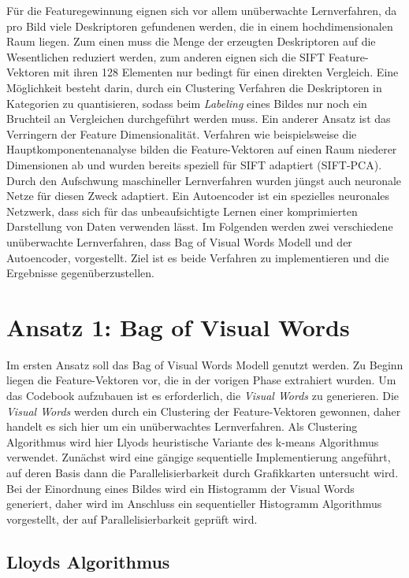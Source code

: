 Für die Featuregewinnung eignen sich vor allem unüberwachte Lernverfahren, da pro Bild viele Deskriptoren gefundenen werden, die in einem hochdimensionalen Raum liegen. Zum einen muss die Menge der erzeugten Deskriptoren auf die Wesentlichen reduziert werden, zum anderen eignen sich die SIFT Feature-Vektoren mit ihren 128 Elementen nur bedingt für einen direkten Vergleich. Eine Möglichkeit besteht darin, durch ein Clustering Verfahren die Deskriptoren in Kategorien zu quantisieren, sodass beim \textit{Labeling} eines Bildes nur noch ein Bruchteil an Vergleichen durchgeführt werden muss. Ein anderer Ansatz ist das Verringern der Feature Dimensionalität. Verfahren wie beispielsweise die Hauptkomponentenanalyse bilden die Feature-Vektoren auf einen Raum niederer Dimensionen ab und wurden bereits speziell für SIFT adaptiert (SIFT-PCA). Durch den Aufschwung maschineller Lernverfahren wurden jüngst auch neuronale Netze für diesen Zweck adaptiert. Ein Autoencoder ist ein spezielles neuronales Netzwerk, dass sich für das unbeaufsichtigte Lernen einer komprimierten Darstellung von Daten verwenden lässt. Im Folgenden werden zwei verschiedene unüberwachte Lernverfahren, dass Bag of Visual Words Modell und der Autoencoder, vorgestellt. Ziel ist es beide Verfahren zu implementieren und die Ergebnisse gegenüberzustellen.

\section{Ansatz 1: Bag of Visual Words}

Im ersten Ansatz soll das Bag of Visual Words Modell genutzt werden. Zu Beginn liegen die Feature-Vektoren vor, die in der vorigen Phase extrahiert wurden. Um das Codebook aufzubauen ist es erforderlich, die \textit{Visual Words} zu generieren. Die \textit{Visual Words} werden durch ein Clustering der Feature-Vektoren gewonnen, daher handelt es sich hier um ein unüberwachtes Lernverfahren. Als Clustering Algorithmus wird hier Llyods heuristische Variante des k-means Algorithmus verwendet. Zunächst wird eine gängige sequentielle Implementierung angeführt, auf deren Basis dann die Parallelisierbarkeit durch Grafikkarten untersucht wird. Bei der Einordnung eines Bildes wird ein Histogramm der Visual Words generiert, daher wird im Anschluss ein sequentieller Histogramm Algorithmus vorgestellt, der auf Parallelisierbarkeit geprüft wird.

\subsection{Lloyds Algorithmus}

